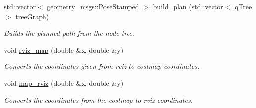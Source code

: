 \begin{DoxyCompactItemize}
std\+::vector$<$ geometry\+\_\+msgs\+::\+Pose\+Stamped $>$ \hyperlink{classRRTPlannerHelper_a76d080da45ea6b5d7163dfc7bce3daf7}{build\+\_\+plan} (std\+::vector$<$ \hyperlink{structRRTPlannerHelper_1_1qTree}{q\+Tree} $>$ tree\+Graph)
\begin{DoxyCompactList}\small\item\em Builds the planned path from the node tree. \end{DoxyCompactList}\item 
void \hyperlink{classRRTPlannerHelper_afde8ae441b0c245d4ea35546cf3628c8}{rviz\+\_\+map} (double \&x, double \&y)
\begin{DoxyCompactList}\small\item\em Converts the coordinates given from rviz to costmap coordinates. \end{DoxyCompactList}\item 
void \hyperlink{classRRTPlannerHelper_a7616495b1de44739bc8decda8dce3691}{map\+\_\+rviz} (double \&x, double \&y)
\begin{DoxyCompactList}\small\item\em Converts the coordinates from the costmap to rviz coordinates. \end{DoxyCompactList}\end{DoxyCompactItemize}
